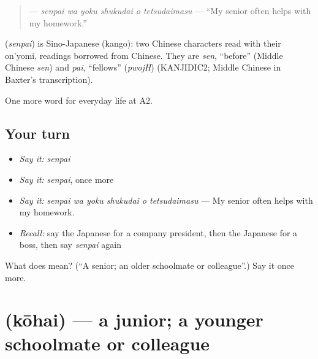 \begin{quote}
\textbf{   } — \emph{senpai wa yoku shukudai o tetsudaimasu} — \textquotedblleft{}My senior often helps with my homework.\textquotedblright{}
\end{quote}

\begin{cousinweb}
\textbf{} (\emph{senpai}) is Sino-Japanese (kango): two Chinese characters read with their on'yomi, readings borrowed from Chinese. They are \emph{sen}, \textquotedblleft{}before\textquotedblright{} (Middle Chinese \emph{sen}) and \emph{pai}, \textquotedblleft{}fellows\textquotedblright{} (\emph{pwojH}) (KANJIDIC2; Middle Chinese in Baxter's transcription).
\end{cousinweb}

\begin{grammarlens}[title={What you've built}]
One more word for everyday life at A2.
\end{grammarlens}

\subsection*{Your turn}
\begin{itemize}
\raggedright
  \item \emph{Say it:} \emph{senpai}
  \item \emph{Say it:} \emph{senpai}, once more
  \item \emph{Say it:} \emph{senpai wa yoku shukudai o tetsudaimasu} — My senior often helps with my homework.
  \item \emph{Recall:} say the Japanese for a company president, then the Japanese for a boss, then say \emph{senpai} again
\end{itemize}

\begin{tcolorbox}[breakable,colback=teal!4,colframe=teal!35!black,title={Before you move on}]
What does  mean? (\textquotedblleft{}A senior; an older schoolmate or colleague\textquotedblright{}.) Say it once more.
\end{tcolorbox}
\section[\texorpdfstring{\ja{こうはい} (kōhai)}{こうはい (kōhai)}]{ (kōhai) — a junior; a younger schoolmate or colleague}

\label{lesson:JA-C230-kouhai}




